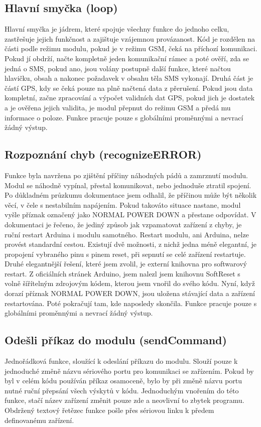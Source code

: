 \documentclass[FM,MP]{tulthesis}  %
\begin{document}
\subsection{Hlavní smyčka (loop)}
Hlavní smyčka je jádrem, které spojuje všechny funkce do jednoho celku, zastřešuje jejich funkčnost a zajištuje vzájemnou provázanost. Kód je rozdělen na části podle režimu modulu, pokud je v režimu GSM, čeká na příchozí komunikaci. Pokud jí obdrží, načte kompletně jeden komunikační rámec a poté ověří, zda se jedná o SMS, pokud ano, jsou volány postupně další funkce, které načtou hlavičku, obsah a nakonec požadavek v obsahu těla SMS vykonají. Druhá část je částí GPS, kdy se čeká pouze na plně načtená data z přerušení. Pokud jsou data kompletní, začne zpracování a výpočet validních dat GPS, pokud jich je dostatek a je ověřena jejich validita, je modul přepnut do režimu GSM a předá mu informace o poloze. Funkce pracuje pouze s globálními proměnnými a nevrací žádný výstup.

\subsection{Rozpoznání chyb (recognizeERROR)}
Funkce byla navržena po zjištění příčiny náhodných pádů a zamrznutí modulu. Modul se náhodně vypínal, přestal komunikovat, nebo jednoduše ztratil spojení. Po důkladném průzkumu dokumentace \cite{ROBOT SW} jsem odhalil, že příčinou může být několik věcí, v čele s nestabilním napájením. Pokud takováto situace nastane, modul vyšle příznak označený jako NORMAL POWER DOWN a přestane odpovídat. V dokumentaci je řečeno, že jediný způsob jak vzpamatovat zařízení z chyby, je ruční restart Arduina i modulu samotného. Restart modulu, ani Arduina, nelze provést standardní cestou. Existují dvě možnosti, z nichž jedna méně elegantní, je propojení vybraného pinu s pinem reset, při sepnutí se celé zařízení restartuje. Druhé elegantnější řešení, které jsem zvolil, je externí knihovna pro softwarový restart. Z oficiálních stránek Arduino, jsem nalezl jsem knihovnu SoftReset \cite{SoftReset} s volně šířítelným zdrojovým kódem, kterou jsem vnořil do svého kódu. Nyní, když dorazí příznak NORMAL POWER DOWN, jsou uložena stávající data a zařízení restartována. Poté pokračují tam, kde naposledy skončila. Funkce pracuje pouze s globálními proměnnými a nevrací žádný výstup.

\subsection{Odešli příkaz do modulu (sendCommand)}
Jednořádková funkce, sloužící k odeslání příkazu do modulu. Slouží pouze k jednoduché změně názvu sériového portu pro komunikaci se zařízením. Pokud by byl v celém kódu používán příkaz osamoceně, bylo by při změně názvu portu nutné ruční přepsání všech výskytů v kódu. Jednoduchým vnořením do této funkce, stačí název zařízení změnit pouze zde a neovlivní to zbytek programu. Obdržený textový řetězec funkce pošle přes sériovou linku k předem definovanému zařízení.
\end{document}
